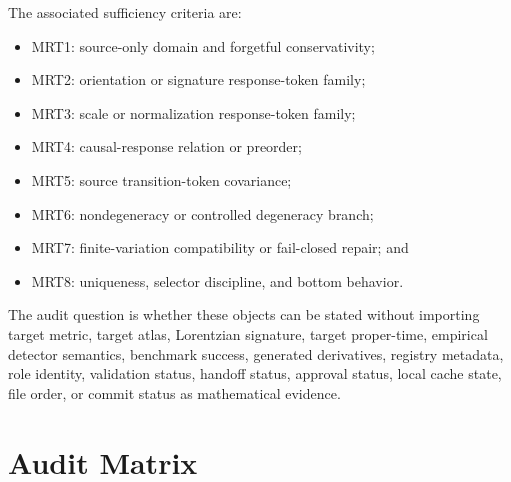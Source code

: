 \documentclass[11pt]{article}
\begin{document}
The associated sufficiency criteria are:

\begin{itemize}[leftmargin=*]
  \item MRT1: source-only domain and forgetful conservativity;
  \item MRT2: orientation or signature response-token family;
  \item MRT3: scale or normalization response-token family;
  \item MRT4: causal-response relation or preorder;
  \item MRT5: source transition-token covariance;
  \item MRT6: nondegeneracy or controlled degeneracy branch;
  \item MRT7: finite-variation compatibility or fail-closed repair; and
  \item MRT8: uniqueness, selector discipline, and bottom behavior.
\end{itemize}

The audit question is whether these objects can be stated without importing
target metric, target atlas, Lorentzian signature, target proper-time,
empirical detector semantics, benchmark success, generated derivatives,
registry metadata, role identity, validation status, handoff status, approval
status, local cache state, file order, or commit status as mathematical
evidence.

\section{Audit Matrix}
\end{document}

